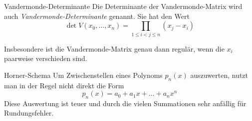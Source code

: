 \begin{defi}{Vandermonde-Determinante}
    Die Determinante der Vandermonde-Matrix wird auch \emph{Vandermonde-Determinante} genannt.
    Sie hat den Wert 
    \[
        \det V(x_0, \ldots, x_n) = \prod_{1 \leq i < j \leq n} (x_j - x_i)
    \]
    
    Insbesondere ist die Vandermonde-Matrix genau dann regulär, wenn die $x_i$ paarweise verschieden sind. 
\end{defi}

\begin{defi}{Horner-Schema}
    Um Zwischenstellen eines Polynoms $p_n(x)$ auszuwerten, nutzt man in der Regel nicht direkt die Form 
    \[
        p_n(x) = a_0 + a_1 x + \ldots + a_n x^n    
    \]
    Diese Auswertung ist teuer und durch die vielen Summationen sehr anfällig für Rundungsfehler.
    

\end{defi}
